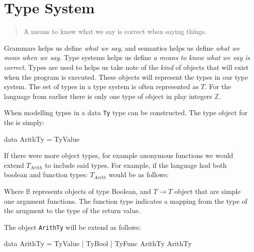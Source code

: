 \section{Type System}
\label{sec:type}

\begin{quote}
A means to know what we say is correct when saying things.
\end{quote}

Grammars helps us define \emph{what we say}, and semantics helps us define \emph{what we mean when we say}.
Type systems helps us define \emph{a means to know what we say is correct}.
Types are used to helps us take note of the \emph{kind} of objects that will exist when the program is executed.
These objects will represent the types in our type system.
The set of types in a type system is often represented as $T$.
For the \allang{} language from earlier there is only one type of object in play integers $\mathbb{Z}$.

\begin{bnf}
\end{bnf}

\noindent
When modelling types in \idris{} a data \texttt{Ty} type can be constructed.
The type object for the \allang{} is simply:

\begin{code}
data ArithTy = TyValue
\end{code}

If there were more object types, for example anonymous functions we would extend $T_{Arith}$ to include said types.
For example, if the \allang{} language had both boolean and function types: $T_{Arith}$ would be as follows:

\begin{bnf}
\end{bnf}

\noindent
Where $\mathbb{B}$ represents objects of type Boolean, and $T\rightarrow T$ object that are simple one argument functions.
The function type indicates a mapping from the type of the arugment to the type of the return value.

The object \texttt{ArithTy} will be extend as follows:

\begin{code}
data ArithTy = TyValue | TyBool | TyFunc ArithTy ArithTy
\end{code}

